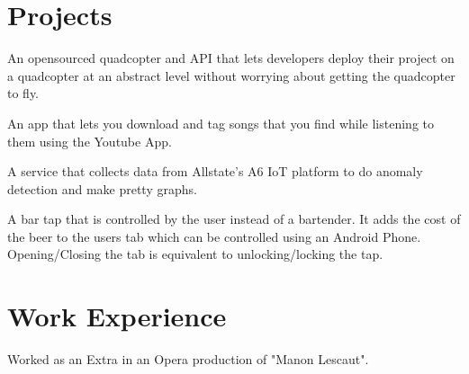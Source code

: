 \documentclass[]{deedy-resume-openfont}
\begin{document}
\begin{minipage}[t]{0.66\textwidth} 


\section{Projects}
An opensourced quadcopter and API that lets developers deploy their project on a quadcopter at an abstract level without worrying about getting the quadcopter to fly.
\sectionsep

An app that lets you download and tag songs that you find while listening to them using the Youtube App.
\sectionsep

A service that collects data from Allstate's A6 IoT platform to do anomaly detection and make pretty graphs.
\sectionsep

A bar tap that is controlled by the user instead of a bartender. It adds the cost of the beer to the users tab which can be controlled using an Android Phone. Opening/Closing the tab is equivalent to unlocking/locking the tap.
\sectionsep


\section{Work Experience} 
Worked as an Extra in an Opera production of "Manon Lescaut".

\sectionsep



\end{minipage}
\end{document}
